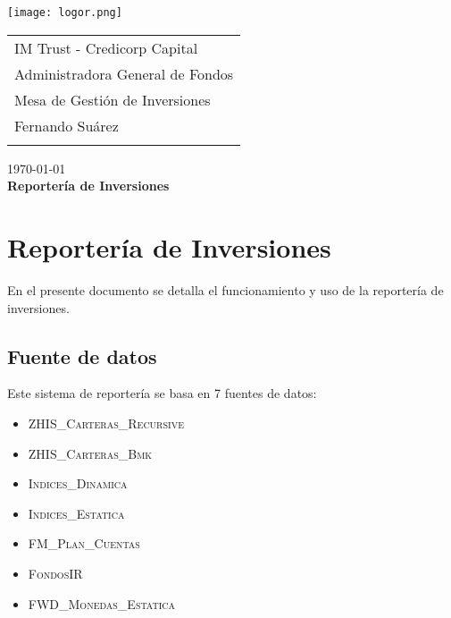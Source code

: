 \documentclass{article}
\begin{document}
\texttt{[image: logor.png]}
\vspace*{-1.55cm}

\hspace*{1.4 cm}
 \hspace*{2.9 cm}
 {\footnotesize
 \begin{tabular}{l}
  \sc IM Trust - Credicorp Capital\\
  \sc Administradora General de Fondos \\
  \sc Mesa de Gestión de Inversiones  \\
  \sc Fernando Suárez  \\
  \vspace{15\baselineskip}\mbox{}
  \vspace{-3mm}\mbox{}
 \end{tabular}
}

 \bigskip

\vspace*{5mm}
\begin{center}
{\today} \\
\vspace{3mm}
{\Large\bf Reportería de Inversiones} \\
\vspace{2mm}
\end{center}
\section{Reportería de Inversiones}


En el presente documento se detalla el funcionamiento y uso de la reportería de inversiones. 
\subsection{Fuente de datos}

Este sistema de reportería se basa en 7 fuentes de datos:
\begin{itemize}
\item \textsc{ZHIS\_Carteras\_Recursive}
\item \textsc{ZHIS\_Carteras\_Bmk}
\item \textsc{Indices\_Dinamica}
\item \textsc{Indices\_Estatica}
\item \textsc{FM\_Plan\_Cuentas}
\item \textsc{FondosIR}
\item \textsc{FWD\_Monedas\_Estatica}
\end{itemize}
\end{document}
